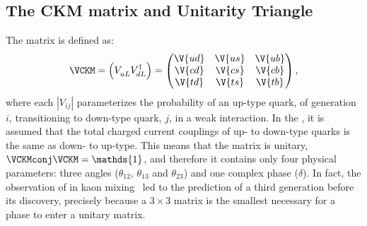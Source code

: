 \subsection{The CKM matrix and Unitarity Triangle}
\label{sec:ckm}

The \ckm matrix is defined as:
\begin{equation}
  \VCKM = \left(V_{uL}^{\phantom{\dagger}} V_{dL}^\dagger\right) =
  \begin{pmatrix}
    \V{ud} & \V{us} & \V{ub} \\
    \V{cd} & \V{cs} & \V{cb} \\
    \V{td} & \V{ts} & \V{tb} \\
  \end{pmatrix},
\end{equation}
where each $|V_{ij}|$ parameterizes the probability of an up-type quark, of generation $i$,
transitioning to down-type quark, $j$, in a weak interaction.
In the \sm, it is assumed that the total charged current couplings of up- to down-type quarks is the
same as down- to up-type.
This means that the \ckm matrix is unitary, $\VCKMconj\VCKM = \mathds{1}$, and therefore it contains
only four physical parameters: three angles ($\theta_{12}$, $\theta_{13}$ and $\theta_{23}$) and one
complex phase ($\delta$).
In fact, the observation of \CPV in kaon mixing~\cite{Christenson:1964fg}
led to the prediction of a third generation before
its discovery, precisely because a $3\times3$ matrix is the smallest necessary for a phase to enter
a unitary matrix.




